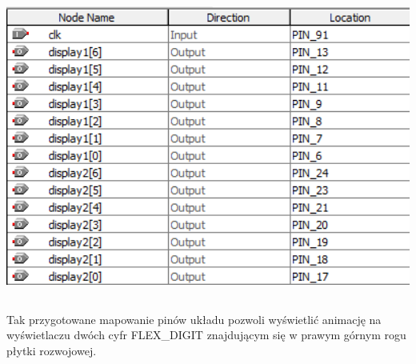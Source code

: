 \documentclass{article}
\begin{document}
        \begin{center}
            \includegraphics[height=10cm]{reports/img/fpga_1.png}\\
        \end{center}
        
        Tak przygotowane mapowanie pinów układu pozwoli wyświetlić animację na wyświetlaczu dwóch cyfr FLEX\_DIGIT znajdującym się w prawym górnym rogu płytki rozwojowej. 

      
      
      
    
    
\end{document}
